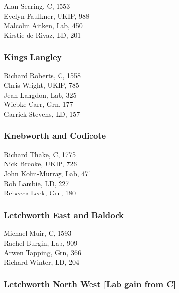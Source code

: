 \documentclass[a4paper,openany,10pt]{book}
\begin{document}


Alan Searing, C, 1553\\
Evelyn Faulkner, UKIP, 988\\
Malcolm Aitken, Lab, 450\\
Kirstie de Rivaz, LD, 201\\


\subsubsection*{Kings Langley}



Richard Roberts, C, 1558\\
Chris Wright, UKIP, 785\\
Jean Langdon, Lab, 325\\
Wiebke Carr, Grn, 177\\
Garrick Stevens, LD, 157\\


\subsubsection*{Knebworth and Codicote}



Richard Thake, C, 1775\\
Nick Brooke, UKIP, 726\\
John Kolm-Murray, Lab, 471\\
Rob Lambie, LD, 227\\
Rebecca Leek, Grn, 180\\


\subsubsection*{Letchworth East and Baldock}



Michael Muir, C, 1593\\
Rachel Burgin, Lab, 909\\
Arwen Tapping, Grn, 366\\
Richard Winter, LD, 204\\


\subsubsection*{Letchworth North West \hspace*{\fill}\nolinebreak[1]%
\enspace\hspace*{\fill}
[Lab gain from C]}
\end{document}
